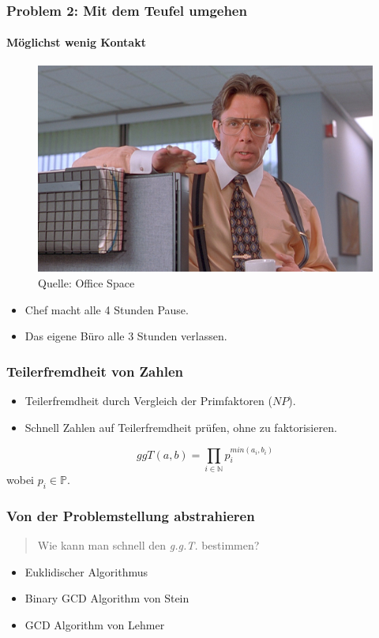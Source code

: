 \documentclass[•]{beamer}
\begin{document}
\begin{frame}
	\frametitle{Problem 2: Mit dem Teufel umgehen}
    \framesubtitle{M\"oglichst wenig Kontakt}
    \pause 
    \vspace*{10pt}
     \begin{figure}
	\centering
	\includegraphics[scale=0.17]{cicada}
	\caption*{\scriptsize{Quelle: Office Space}}
	\end{figure}
    \begin{itemize}
    \pause 
    \item Chef macht alle 4 Stunden Pause.
    \pause 
    \item Das eigene B\"uro alle 3 Stunden verlassen.
    \end{itemize}
\end{frame}

\begin{frame}
	\frametitle{Teilerfremdheit von Zahlen}
	\pause 
\begin{itemize}
\item Teilerfremdheit durch Vergleich der Primfaktoren ($NP$).
\pause
\item Schnell Zahlen auf Teilerfremdheit pr\"ufen, ohne zu faktorisieren.
\end{itemize}
\pause 
$$ggT(a,b) = \prod_{i \in \mathbb{N}} p_{i}^{min(a_i,b_i)}$$ wobei $p_{i} \in \mathbb{P}$.
\end{frame}

\begin{frame}
\frametitle{Von der Problemstellung abstrahieren}
\pause 
\begin{quote}
		Wie kann man schnell den \textit{g.g.T.} bestimmen?
	\end{quote}
	\pause 
	\begin{itemize}
	\item Euklidischer Algorithmus
	\item Binary GCD Algorithm von Stein
	\item GCD Algorithm von Lehmer
	\end{itemize}
\end{frame}
\end{document}
